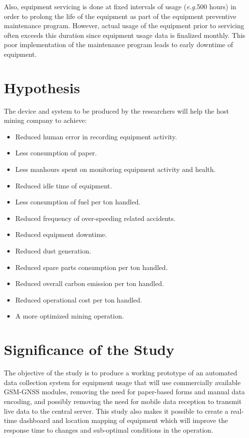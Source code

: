 \documentclass[12pt]{report}
\newcommand{\eg}{\emph{e.g.}}
\begin{document}
Also, equipment servicing is done at fixed intervals of usage (\eg 500 hours) in order to prolong the life of the equipment as part of the equipment preventive maintenance program.
However, actual usage of the equipment prior to servicing often exceeds this duration since equipment usage data is finalized monthly.
This poor implementation of the maintenance program leads to early downtime of equipment.

\section{Hypothesis}

The device and system to be produced by the researchers will help the host mining company to achieve:
\begin{itemize}
\setlength\itemsep{-0.1em}
    \item Reduced human error in recording equipment activity.
    \item Less consumption of paper.
    \item Less manhours spent on monitoring equipment activity and health.
    \item Reduced idle time of equipment.
    \item Less consumption of fuel per ton handled.
    \item Reduced frequency of over-speeding related accidents.
    \item Reduced equipment downtime.
    \item Reduced dust generation.
    \item Reduced spare parts consumption per ton handled.
    \item Reduced overall carbon emission per ton handled.
    \item Reduced operational cost per ton handled.
    \item A more optimized mining operation.
\end{itemize}

\section{Significance of the Study}

The objective of the study is to produce a working prototype of an automated data collection system for equipment usage that will use commercially available GSM-GNSS modules, removing the need for paper-based forms and manual data encoding, and possibly removing the need for mobile data reception to transmit live data to the central server.
This study also makes it possible to create a real-time dashboard and location mapping of equipment which will improve the response time to changes and sub-optimal conditions in the operation.
\end{document}
